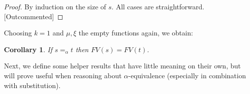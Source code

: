 \documentclass{lmcs}
\theoremstyle{theorem}\newtheorem{theorem}[dummy]{Theorem}
\theoremstyle{theorem}\newtheorem{lemma}[dummy]{Lemma}
\theoremstyle{theorem}\newtheorem{corollary}[dummy]{Corollary}
\theoremstyle{definition}\newtheorem{definition}[dummy]{Definition}
\theoremstyle{definition}\newtheorem{example}[dummy]{Example}
\newcommand{\FV}{\mathit{FV}}
\newcommand{\identifier}[1]{\mathtt{#1}}
\newcommand{\afun}{\identifier{f}}
\newcommand{\abs}[2]{\lambda #1.#2}
\begin{document}
\begin{proof}
By induction on the size of $s$.
All cases are straightforward. [Outcommented]
\end{proof}

Choosing $k = 1$ and $\mu,\xi$ the empty functions again, we obtain:

\begin{corollary}\label{corr:alphafreevar}
If $s =_\alpha t$ then $\FV(s) = \FV(t)$.
\end{corollary}

Next, we define some helper results that have little meaning on their own, but will prove useful
when reasoning about $\alpha$-equivalence (especially in combination with substitution).
\end{document}
